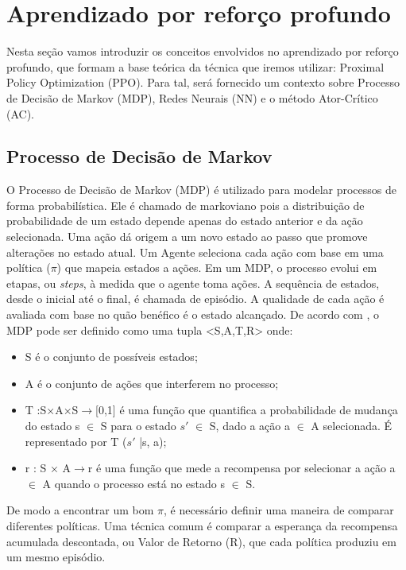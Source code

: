 \section{Aprendizado por reforço profundo}
Nesta seção vamos introduzir os conceitos envolvidos no aprendizado por reforço profundo, que formam a base teórica da técnica que iremos utilizar: Proximal Policy Optimization (PPO). 
Para tal, será fornecido um contexto sobre Processo de Decisão de Markov (MDP), Redes Neurais (NN) e o método Ator-Crítico (AC). 


\subsection{Processo de Decisão de Markov}
O Processo de Decisão de Markov (MDP) é utilizado para modelar processos de forma probabilística. Ele é chamado de markoviano pois a distribuição de probabilidade de um estado depende apenas do estado anterior e da ação selecionada. Uma ação dá origem a um novo estado ao passo que promove alterações no estado atual. Um Agente seleciona cada ação com base em uma política ($\pi$) que mapeia estados a ações. Em um MDP, o processo evolui em etapas, ou \textit{steps}, à medida que o agente toma ações. A sequência de estados, desde o inicial até o final, é chamada de episódio. A qualidade de cada ação é avaliada com base no quão benéfico é o estado alcançado.
De acordo com \cite{MDP}, o MDP pode ser definido como uma tupla 
<S,A,T,R> onde:

\begin{itemize}
   \item S é o conjunto de possíveis estados;
   \item A é o conjunto de ações que interferem no processo;
   \item T :S×A×S$\rightarrow$[0,1] é uma função que quantifica a probabilidade de mudança do estado s $\in$ S para o estado $s'$ $\in$ S, dado a ação a $\in$ A selecionada. É representado por T ($s'$ |s, a);
   \item r : S × A$\rightarrow$r é uma função que mede a recompensa por selecionar a ação a $\in$ A quando o processo está no estado s $\in$ S.
 \end{itemize}

De modo a encontrar um bom $\pi$, é necessário definir uma maneira de comparar diferentes políticas. Uma técnica comum é comparar a esperança da recompensa acumulada descontada, ou Valor de Retorno (R), que cada política produziu em um mesmo episódio.

